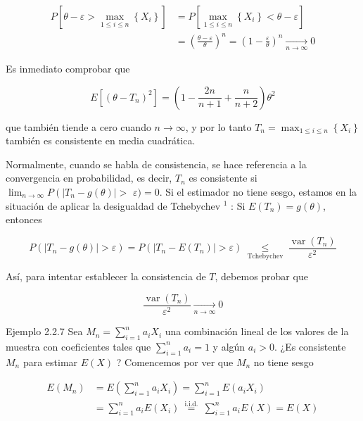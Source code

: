\documentclass[
]{article}
\begin{document}
\[
\begin{aligned}
P\left[\theta-\varepsilon>\max _{1 \leq i \leq n}\left\{X_{i}\right\}\right] & =P\left[\max _{1 \leq i \leq n}\left\{X_{i}\right\}<\theta-\varepsilon\right] \\
& =\left(\frac{\theta-\varepsilon}{\theta}\right)^{n}=\left(1-\frac{\varepsilon}{\theta}\right)^{n} \underset{n \rightarrow \infty}{\longrightarrow} 0
\end{aligned}
\]

Es inmediato comprobar que

\[
E\left[\left(\theta-T_{n}\right)^{2}\right]=\left(1-\frac{2 n}{n+1}+\frac{n}{n+2}\right) \theta^{2}
\]

que también tiende a cero cuando \(n \rightarrow \infty\), y por lo tanto \(T_{n}=\max _{1 \leq i \leq n}\left\{X_{i}\right\}\) también es consistente en media cuadrática.

Normalmente, cuando se habla de consistencia, se hace referencia a la convergencia en probabilidad, es decir, \(T_{n}\) es consistente si \(\lim _{n \rightarrow \infty} P\left(\left|T_{n}-g(\theta)\right|>\right.\) \(\varepsilon)=0\). Si el estimador no tiene sesgo, estamos en la situación de aplicar la desigualdad de Tchebychev \({ }^{1}\) :
Si \(E\left(T_{n}\right)=g(\theta)\), entonces

\[
P\left(\left|T_{n}-g(\theta)\right|>\varepsilon\right)=P\left(\left|T_{n}-E\left(T_{n}\right)\right|>\varepsilon\right) \underset{\text { Tchebychev }}{\leq} \frac{\operatorname{var}\left(T_{n}\right)}{\varepsilon^{2}}
\]

Así, para intentar establecer la consistencia de \(T\), debemos probar que

\[
\frac{\operatorname{var}\left(T_{n}\right)}{\varepsilon^{2}} \underset{n \rightarrow \infty}{\longrightarrow} 0
\]

Ejemplo 2.2.7 Sea \(M_{n}=\sum_{i=1}^{n} a_{i} X_{i}\) una combinación lineal de los valores de la muestra con coeficientes tales que \(\sum_{i=1}^{n} a_{i}=1\) y algún \(a_{i}>0\). ¿Es consistente \(M_{n}\) para estimar \(E(X)\) ?
Comencemos por ver que \(M_{n}\) no tiene sesgo

\[
\begin{aligned}
E\left(M_{n}\right) & =E\left(\sum_{i=1}^{n} a_{i} X_{i}\right)=\sum_{i=1}^{n} E\left(a_{i} X_{i}\right) \\
& =\sum_{i=1}^{n} a_{i} E\left(X_{i}\right) \stackrel{\text { i.i.d. }}{=} \sum_{i=1}^{n} a_{i} E(X)=E(X)
\end{aligned}
\]
\end{document}

